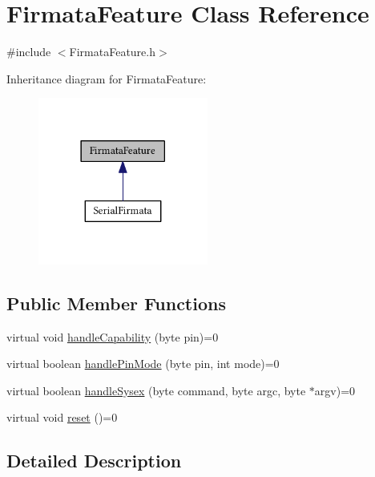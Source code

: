 \hypertarget{class_firmata_feature}{}\section{Firmata\+Feature Class Reference}
\label{class_firmata_feature}


{\ttfamily \#include $<$Firmata\+Feature.\+h$>$}



Inheritance diagram for Firmata\+Feature\+:\nopagebreak
\begin{figure}[H]
\begin{center}
\leavevmode
\includegraphics[width=158pt]{class_firmata_feature__inherit__graph}
\end{center}
\end{figure}
\subsection*{Public Member Functions}
\begin{DoxyCompactItemize}
\item 
virtual void \hyperlink{class_firmata_feature_aa865c5a740a429805855ca1a4576a6f4}{handle\+Capability} (byte pin)=0
\item 
virtual boolean \hyperlink{class_firmata_feature_a6ef5569de60bb31c9eb55f5ebd16d88f}{handle\+Pin\+Mode} (byte pin, int mode)=0
\item 
virtual boolean \hyperlink{class_firmata_feature_a0ce860a9345c81cbe959733e88b188be}{handle\+Sysex} (byte command, byte argc, byte $\ast$argv)=0
\item 
virtual void \hyperlink{class_firmata_feature_a511a8cc9f0e33b392ca729cab0f6e899}{reset} ()=0
\end{DoxyCompactItemize}


\subsection{Detailed Description}


